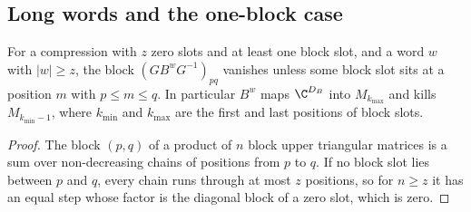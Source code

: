 \subsection{Long words and the one-block case}

\begin{lemma}
    \label{lem:asym_uniq_long_words}
    \leanok
    For a compression with $z$ zero slots and at least one block slot, and a word $w$ with
    $|w|\geq z$, the block $(GB^wG^{-1})_{pq}$ vanishes unless some block slot sits at a position
    $m$ with $p\leq m\leq q$. In particular $B^w$ maps $\C^{D_B}$ into $M_{k_{\max}}$ and kills
    $M_{k_{\min}-1}$, where $k_{\min}$ and $k_{\max}$ are the first and last positions of block slots.
\end{lemma}

\begin{proof}
    \leanok
    The block $(p,q)$ of a product of $n$ block upper triangular matrices is a sum over
    non-decreasing chains of positions from $p$ to $q$. If no block slot lies between $p$ and $q$,
    every chain runs through at most $z$ positions, so for $n\geq z$ it has an equal step whose
    factor is the diagonal block of a zero slot, which is zero.
\end{proof}

